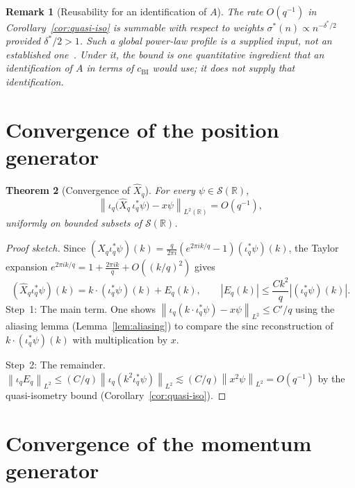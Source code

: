 \documentclass[12pt,a4paper]{article}
\newtheorem{theorem}{Theorem}[section]
\newtheorem{remark}[theorem]{Remark}
\newcommand{\Schwartz}{\mathcal{S}(\mathbb{R})}
\newcommand{\iotaq}{\iota_q}
\newcommand{\iotastar}{\iota_q^*}
\newcommand{\Xhat}{\hat{X}_q}
\newcommand{\norm}[1]{\left\|#1\right\|}
\newcommand{\abs}[1]{\left|#1\right|}
\begin{document}
      \begin{remark}[Reusability for an identification of $A$]
        \label{rem:reusability}
        The rate $O(q^{-1})$ in Corollary~\ref{cor:quasi-iso} is summable with respect to
        weights $\sigma^*(n) \propto n^{-\delta^*/2}$ provided $\delta^*/2 > 1$.
        Such a global power-law profile is a supplied input, not an established
        one~\cite{Beau2026w1}.
        Under it, the bound is one quantitative ingredient that an identification of $A$ in terms
        of $c_{\mathrm{BI}}$ would use; it does not supply that identification.
      \end{remark}

      \newpage
  \section{Convergence of the position generator}
    \label{sec:position}

    \begin{theorem}[Convergence of $\Xhat$]
      \label{thm:position}
      For every $\psi \in \Schwartz$,
      \[
        \norm{\iotaq\bigl(\Xhat\,\iotastar\psi\bigr) - x\psi}_{L^2(\mathbb{R})}
        = O\!\left(q^{-1}\right),
      \]
      uniformly on bounded subsets of $\Schwartz$.
    \end{theorem}

    \begin{proof}
      [Proof sketch]
Since $(\Xhat \iotastar\psi)(k) = \frac{q}{2\pi i}(e^{2\pi ik/q} - 1)(\iotastar\psi)(k)$,
the Taylor expansion $e^{2\pi ik/q} = 1 + \frac{2\pi ik}{q} + O((k/q)^2)$ gives
\[
  (\Xhat \iotastar\psi)(k) = k\cdot(\iotastar\psi)(k) + E_q(k),
  \qquad \abs{E_q(k)} \leq \frac{C k^2}{q} \abs{(\iotastar\psi)(k)}.
\]
Step~1: The main term.
One shows $\norm{\iotaq(k \cdot \iotastar\psi) - x\psi}_{L^2} \leq C'/q$ using
the aliasing lemma (Lemma~\ref{lem:aliasing}) to compare the sinc reconstruction
of $k \cdot (\iotastar\psi)(k)$ with multiplication by $x$.

Step~2: The remainder.
$\norm{\iotaq E_q}_{L^2} \leq (C/q)\norm{\iotaq(k^2 \iotastar\psi)}_{L^2}
\lesssim (C/q)\norm{x^2 \psi}_{L^2} = O(q^{-1})$
by the quasi-isometry bound (Corollary~\ref{cor:quasi-iso}).
    \end{proof}

    \newpage
  \section{Convergence of the momentum generator}
    \label{sec:momentum}
\end{document}
